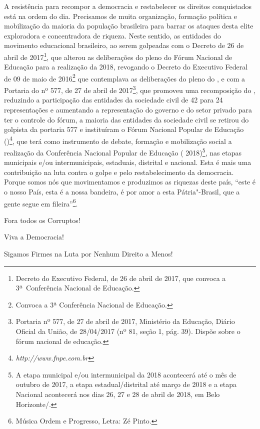 A resistência para recompor a democracia e restabelecer os direitos
conquistados está na ordem do dia. Precisamos de muita organização,
formação política e mobilização da maioria da população brasileira para
barrar os ataques desta elite exploradora e concentradora de riqueza.
Neste sentido, as entidades do movimento educacional brasileiro, ao
serem golpeadas com o Decreto de 26 de abril de 2017\footnote{Decreto
  do Executivo Federal, de 26 de abril de 2017, que convoca a
  3ª~Conferência Nacional de Educação.}, que alterou as
deliberações do pleno do Fórum Nacional de Educação para a realização da
 2018, revogando o Decreto do Executivo Federal de 09 de maio de
2016\footnote{Convoca a 3ª Conferência Nacional de Educação.} que contemplava
as deliberações do pleno do , e com a Portaria do  nº 577, de 27
de abril de 2017\footnote{Portaria nº 577, de 27 de abril de
  2017, Ministério da Educação, Diário Oficial da União, de 28/04/2017
  (nº 81, seção 1, pág. 39). Dispõe sobre o fórum nacional de
  educação.},
que promoveu uma recomposição do , reduzindo a participação das
entidades da sociedade civil de 42 para 24 representações e aumentando a
representação do governo e do setor privado para ter o controle do
fórum, a maioria das entidades da sociedade civil se retirou do 
golpista da portaria 577 e instituíram o Fórum Nacional Popular de
Educação ()\footnote{\emph{http://www.fnpe.com.br}},
que terá como instrumento de debate, formação e mobilização social a
realização da Conferência Nacional Popular de Educação (
2018)\footnote{A etapa municipal e/ou intermunicipal da 
  2018 acontecerá até o mês de outubro de 2017, a etapa
  estadual/distrital até março de 2018 e a etapa Nacional acontecerá nos
  dias 26, 27 e 28 de abril de 2018, em Belo Horizonte/.}, nas etapas
municipais e/ou intermunicipais, estaduais, distrital e nacional. Esta é
mais uma contribuição na luta contra o golpe e pelo restabelecimento da
democracia. Porque somos nós que movimentamos e produzimos as riquezas
deste país, ``este é o nosso País, esta é a nossa bandeira, é por amor a
esta Pátria"-Brasil, que a gente segue em fileira''\footnote{Música Ordem
  e Progresso, Letra: Zé Pinto.}.

Fora todos os Corruptos!

Viva a Democracia!

Sigamos Firmes na Luta por Nenhum Direito a Menos!
